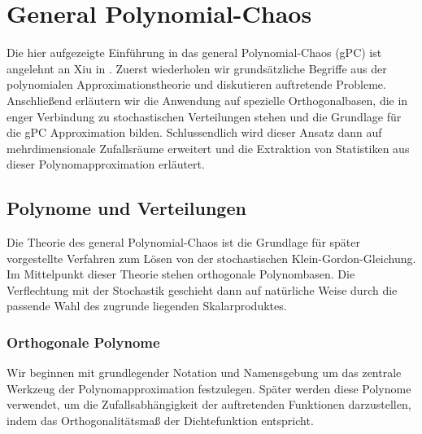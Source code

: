 
\chapter{General Polynomial-Chaos}
\label{Chapter3}
Die hier aufgezeigte Einführung in das general Polynomial-Chaos (gPC) ist angelehnt an Xiu in \autocite{dongbinxiu2010}. Zuerst wiederholen wir grundsätzliche Begriffe aus der polynomialen Approximationstheorie und diskutieren auftretende Probleme. Anschließend erläutern wir die Anwendung auf spezielle Orthogonalbasen, die in enger Verbindung zu stochastischen Verteilungen stehen und die Grundlage für die gPC Approximation bilden. Schlussendlich wird dieser Ansatz dann auf mehrdimensionale Zufallsräume erweitert und die Extraktion von Statistiken aus dieser Polynomapproximation erläutert.
\section{Polynome und Verteilungen}
Die Theorie des general Polynomial-Chaos ist die Grundlage für später vorgestellte Verfahren zum Lösen von der stochastischen Klein-Gordon-Gleichung. Im Mittelpunkt dieser Theorie stehen orthogonale Polynombasen. Die Verflechtung mit der Stochastik geschieht dann auf natürliche Weise durch die passende Wahl des zugrunde liegenden Skalarproduktes.
\subsection{Orthogonale Polynome}
Wir beginnen mit grundlegender Notation und Namensgebung um das zentrale Werkzeug der Polynomapproximation festzulegen. Später werden diese Polynome verwendet, um die Zufallsabhängigkeit der auftretenden Funktionen darzustellen, indem das Orthogonalitätsmaß der Dichtefunktion entspricht.

